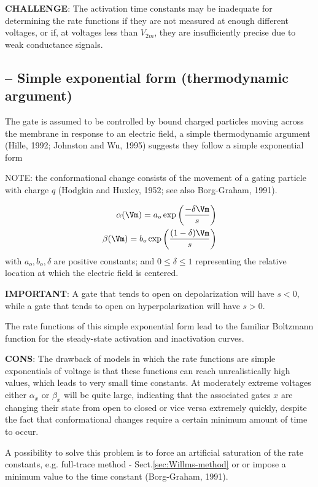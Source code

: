 {\bf CHALLENGE}:  The activation time constants may be inadequate for
determining the rate functions if they are not measured at enough different
voltages, or if, at voltages less than $V_{2m}$, they are insufficiently precise
due to weak conductance signals.

\subsection{-- Simple exponential form (thermodynamic argument)}
\label{sec:rate-function-simple-exponential-form}

The gate is assumed to be controlled by bound charged
particles moving across the membrane in response to
an electric field, a simple thermodynamic argument
(Hille, 1992; Johnston and Wu, 1995) suggests
they follow a simple exponential form

NOTE: the conformational change consists of the movement of a
gating particle with charge $q$ (Hodgkin and Huxley, 1952; see also Borg-Graham,
1991).

\begin{equation}
\begin{split}
\alpha(\Vm) = a_o \exp\left( \frac{-\delta \Vm}{s} \right) \\
\beta(\Vm) = b_o \exp\left( \frac{(1-\delta)\Vm}{s}  \right)
\end{split}
\end{equation}
with $a_o,b_o, \delta$ are positive constants; and $0 \le \delta \le 1$
representing the relative location at which the electric field is centered.

{\bf IMPORTANT}: A gate that tends to open on depolarization will have $s<0$,
while a gate that tends to open on hyperpolarization will have $s>0$.

The rate functions of this simple exponential form lead to the familiar
Boltzmann function for the steady-state activation and inactivation curves.

{\bf CONS}: The drawback of models in which the rate functions are simple
exponentials of voltage is that these functions can reach unrealistically high
values, which leads to very small time constants. At moderately extreme voltages
either $\alpha_x$ or $\beta_x$ will be quite large, indicating that the
associated gates $x$ are changing their state from open to closed or vice versa
extremely quickly, despite the fact that conformational changes require a
certain minimum amount of time to occur.

A possibility to solve this problem is to force an artificial saturation of the
rate constants, e.g. full-trace method - Sect.\ref{sec:Willms-method} or
or impose a minimum value to the time constant (Borg-Graham, 1991).





